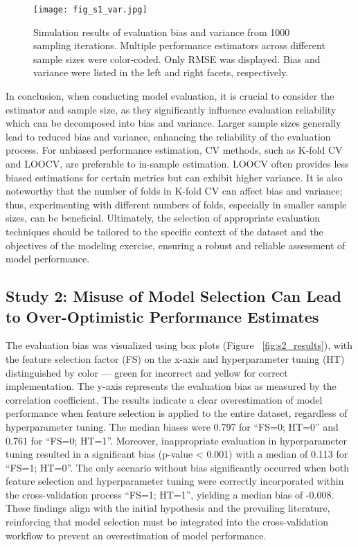 \begin{figure}[h]
    \centering
    \texttt{[image: fig\_s1\_var.jpg]}
    \caption{Simulation results of evaluation bias and variance from 1000 sampling iterations. Multiple performance estimators across different sample sizes were color-coded. Only RMSE was displayed. Bias and variance were listed in the left and right facets, respectively.}
    \label{fig:s1_var}
\end{figure}

In conclusion, when conducting model evaluation, it is crucial to consider the estimator and sample size, as they significantly influence evaluation reliability which can be decomposed into bias and variance. Larger sample sizes generally lead to reduced bias and variance, enhancing the reliability of the evaluation process. For unbiased performance estimation, CV methods, such as K-fold CV and LOOCV, are preferable to in-sample estimation. LOOCV often provides less biased estimations for certain metrics but can exhibit higher variance. It is also noteworthy that the number of folds in K-fold CV can affect bias and variance; thus, experimenting with different numbers of folds, especially in smaller sample sizes, can be beneficial. Ultimately, the selection of appropriate evaluation techniques should be tailored to the specific context of the dataset and the objectives of the modeling exercise, ensuring a robust and reliable assessment of model performance.

\subsection{Study 2: Misuse of Model Selection Can Lead to Over-Optimistic Performance Estimates}

The evaluation bias was visualized using box plots (Figure ~\ref{fig:s2_results}), with the feature selection factor (FS) on the x-axis and hyperparameter tuning (HT) distinguished by color — green for incorrect and yellow for correct implementation. The y-axis represents the evaluation bias as measured by the correlation coefficient. The results indicate a clear overestimation of model performance when feature selection is applied to the entire dataset, regardless of hyperparameter tuning. The median biases were 0.797 for “FS=0; HT=0” and 0.761 for “FS=0; HT=1”. Moreover, inappropriate evaluation in hyperparameter tuning resulted in a significant bias (p-value < 0.001) with a median of 0.113 for “FS=1; HT=0”. The only scenario without bias significantly occurred when both feature selection and hyperparameter tuning were correctly incorporated within the cross-validation process “FS=1; HT=1”, yielding a median bias of -0.008. These findings align with the initial hypothesis and the prevailing literature, reinforcing that model selection must be integrated into the cross-validation workflow to prevent an overestimation of model performance.

